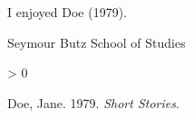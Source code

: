 
%
%
\newlength{\cslhangindent}
\setlength{\cslhangindent}{1.5em}
\newlength{\csllabelwidth}
\setlength{\csllabelwidth}{3em}
\newenvironment{CSLReferences}[2] %
 {%
  \setlength{\parindent}{0pt}
  \ifodd #1 \everypar{\setlength{\hangindent}{\cslhangindent}}\ignorespaces\fi
  \ifnum #2 > 0
  \setlength{\parskip}{#2\baselineskip}
  \fi
 }%
 {}
\usepackage{calc}
\newcommand{\CSLBlock}[1]{#1\hfill\break}
\newcommand{\CSLLeftMargin}[1]{\parbox[t]{\csllabelwidth}{#1}}
\newcommand{\CSLRightInline}[1]{\parbox[t]{\linewidth - \csllabelwidth}{#1}\break}
\newcommand{\CSLIndent}[1]{\hspace{\cslhangindent}#1}



I enjoyed Doe (1979).

Seymour Butz
School of Studies


\hypertarget{refs}{}
\begin{CSLReferences}{1}{0}
\leavevmode\hypertarget{ref-Doe}{}%
Doe, Jane. 1979. \emph{Short Stories}.

\end{CSLReferences}


